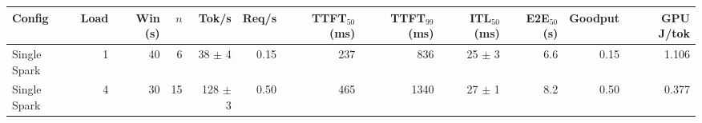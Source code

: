 \begin{tabular}{l r r r r r r r r r r r}
\toprule
Config & Load & Win (s) & $n$ & Tok/s & Req/s & TTFT$_{50}$ (ms) & TTFT$_{99}$ (ms) & ITL$_{50}$ (ms) & E2E$_{50}$ (s) & Goodput & GPU J/tok \\
\midrule
Single Spark & 1 & 40 & 6\rlap{$^\dagger$} & 38 $\pm$ 4 & 0.15 & 237 & 836 & 25 $\pm$ 3 & 6.6 & 0.15 & 1.106 \\
Single Spark & 4 & 30 & 15\rlap{$^\dagger$} & 128 $\pm$ 3 & 0.50 & 465 & 1340 & 27 $\pm$ 1 & 8.2 & 0.50 & 0.377 \\
\bottomrule
\end{tabular}
